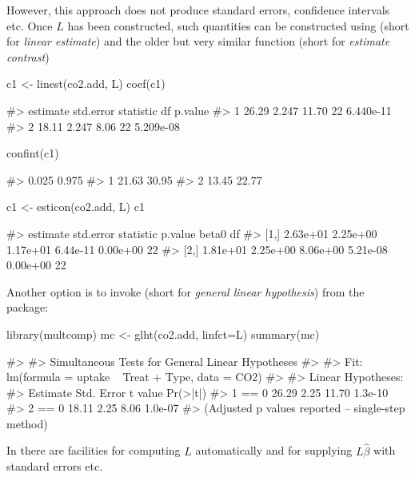 However, this approach does not produce standard errors, confidence
intervals etc. Once \(L\) has been constructed, such quantities can be
constructed using  (short for \emph{linear estimate}) and
the older but very similar  function (short for
\emph{estimate contrast})

\begin{Schunk}
\begin{Sinput}
c1 <- linest(co2.add, L)
coef(c1)
\end{Sinput}
\begin{Soutput}
#>   estimate std.error statistic df   p.value
#> 1    26.29     2.247     11.70 22 6.440e-11
#> 2    18.11     2.247      8.06 22 5.209e-08
\end{Soutput}
\begin{Sinput}
confint(c1)
\end{Sinput}
\begin{Soutput}
#>   0.025 0.975
#> 1 21.63 30.95
#> 2 13.45 22.77
\end{Soutput}
\begin{Sinput}
c1 <- esticon(co2.add, L)
c1
\end{Sinput}
\begin{Soutput}
#>      estimate std.error statistic  p.value    beta0 df
#> [1,] 2.63e+01  2.25e+00  1.17e+01 6.44e-11 0.00e+00 22
#> [2,] 1.81e+01  2.25e+00  8.06e+00 5.21e-08 0.00e+00 22
\end{Soutput}
\end{Schunk}

Another option is to invoke  (short for \emph{general linear
hypothesis}) from the  package:

\begin{Schunk}
\begin{Sinput}
library(multcomp)
mc <- glht(co2.add, linfct=L)
summary(mc)
\end{Sinput}
\begin{Soutput}
#> 
#>   Simultaneous Tests for General Linear Hypotheses
#> 
#> Fit: lm(formula = uptake ~ Treat + Type, data = CO2)
#> 
#> Linear Hypotheses:
#>        Estimate Std. Error t value Pr(>|t|)
#> 1 == 0    26.29       2.25   11.70  1.3e-10
#> 2 == 0    18.11       2.25    8.06  1.0e-07
#> (Adjusted p values reported -- single-step method)
\end{Soutput}
\end{Schunk}

In  there are facilities for computing \(L\) automatically and
for supplying \(L\hat\beta\) with standard errors etc.

